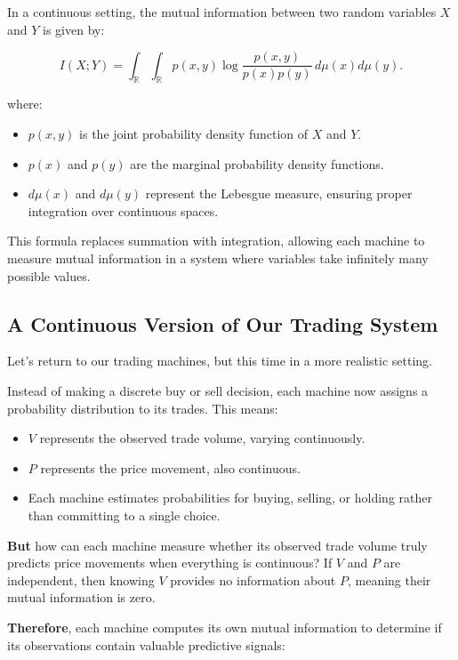 In a continuous setting, the mutual information between two random variables \( X \) and \( Y \) is given by:

\[
I(X; Y) = \int_{\mathbb{R}} \int_{\mathbb{R}} p(x, y) \log \frac{p(x, y)}{p(x) p(y)} \, d\mu(x) d\mu(y).
\]

where:
\begin{itemize}
    \item \( p(x, y) \) is the joint probability density function of \( X \) and \( Y \).
    \item \( p(x) \) and \( p(y) \) are the marginal probability density functions.
    \item \( d\mu(x) \) and \( d\mu(y) \) represent the Lebesgue measure, ensuring proper integration over continuous spaces.
\end{itemize}

This formula replaces summation with integration, allowing each machine to measure mutual information in a system where variables take infinitely many possible values.

\subsection{A Continuous Version of Our Trading System}

Let’s return to our trading machines, but this time in a more realistic setting.

Instead of making a discrete buy or sell decision, each machine now assigns a probability distribution to its trades. This means:

\begin{itemize}
    \item \( V \) represents the observed trade volume, varying continuously.
    \item \( P \) represents the price movement, also continuous.
    \item Each machine estimates probabilities for buying, selling, or holding rather than committing to a single choice.
\end{itemize}

\textbf{But} how can each machine measure whether its observed trade volume truly predicts price movements when everything is continuous? If \( V \) and \( P \) are independent, then knowing \( V \) provides no information about \( P \), meaning their mutual information is zero.

\textbf{Therefore}, each machine computes its own mutual information to determine if its observations contain valuable predictive signals:

